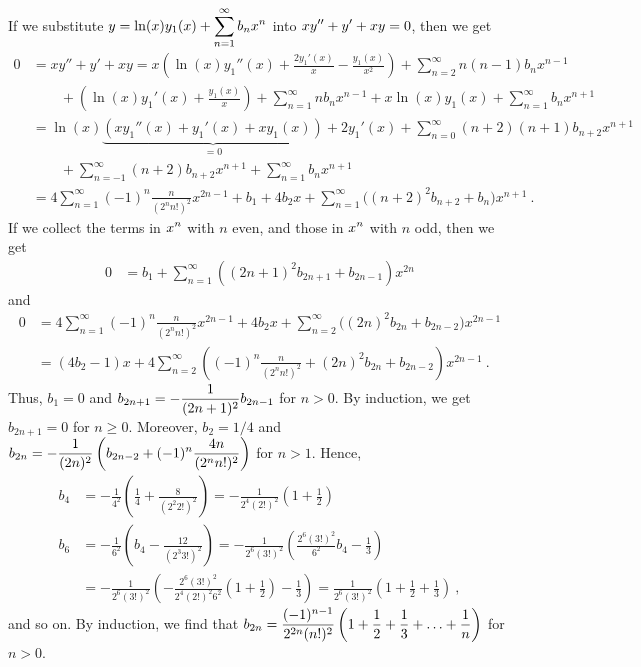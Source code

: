 \begin{egg}
If we substitute
$\displaystyle y = \ln(x)y_1(x) + \sum_{n=1}^\infty b_n x^n$ into
$\displaystyle xy''+ y' + xy = 0$, then we get
\begin{align*}
0 & = xy''+ y' + xy
= x\left( \ln(x) y_1''(x) + \frac{2y_1'(x)}{x}- \frac{y_1(x)}{x^2}\right)
+ \sum_{n=2}^\infty n(n-1) b_n x^{n-1}\\
&\qquad + \left( \ln(x) y_1'(x) + \frac{y_1(x)}{x}\right) 
+ \sum_{n=1}^\infty n b_n x^{n-1} + x \ln(x) y_1(x)
+ \sum_{n=1}^\infty b_n x^{n+1} \\
&= \ln(x) \underbrace{\left( x y_1''(x) + y_1'(x) + x y_1(x)\right)}_{=0}
+2 y_1'(x) + \sum_{n=0}^\infty (n+2)(n+1) b_{n+2} x^{n+1} \\
&\qquad + \sum_{n=-1}^\infty (n+2) b_{n+2} x^{n+1}
+ \sum_{n=1}^\infty b_n x^{n+1} \\
&=4\sum_{n=1}^\infty (-1)^n \frac{n}{ (2^n n!)^2}x^{2n-1} + b_1 + 4 b_2x
+ \sum_{n=1}^\infty \big( (n+2)^2 b_{n+2} + b_n\big) x^{n+1} \ .
\end{align*}
If we collect the terms in $\displaystyle x^n$ with $n$ even, and
those in $\displaystyle x^n$ with $n$ odd, then we get
\begin{align*}
0 &= b_1 + \sum_{n=1}^\infty \left((2n+1)^2 b_{2n+1}+b_{2n-1}\right) x^{2n}
\end{align*}
and
\begin{align*}
0 &= 4\sum_{n=1}^\infty (-1)^n \frac{n}{ (2^n n!)^2}x^{2n-1} + 4b_2 x 
+ \sum_{n=2}^\infty \big( (2n)^2 b_{2n} + b_{2n-2}\big) x^{2n-1} \\
&= (4b_2-1)x + 4\sum_{n=2}^\infty\left((-1)^n \frac{n}{(2^n n!)^2}
+ (2n)^2 b_{2n} + b_{2n-2}\right) x^{2n-1} \  .
\end{align*}
Thus, $b_1=0$ and
$\displaystyle b_{2n+1} = - \frac{1}{(2n+1)^2}b_{2n-1}$
for $n >0$.  By induction, we get $b_{2n+1} = 0$ for $n \geq 0$.
Moreover, $b_2 = 1/4$ and
$\displaystyle b_{2n} = -\frac{1}{(2n)^2} \left( b_{2n-2} +
 (-1)^n \frac{4n}{(2^n n!)^2}\right)$
for $n>1$.  Hence,
\begin{align*}
b_4 &= -\frac{1}{4^2} \left( \frac{1}{4} + \frac{8}{(2^2 2!)^2}\right)
= -\frac{1}{2^4 (2!)^2}\left( 1 + \frac{1}{2} \right) \\
b_6 &= -\frac{1}{6^2} \left( b_4 - \frac{12}{(2^3 3!)^2}\right)
= -\frac{1}{2^6 (3!)^2} \left( \frac{2^6(3!)^2}{6^2}b_4 -\frac{1}{3}\right) \\
&= -\frac{1}{2^6 (3!)^2} \left( 
-\frac{2^6(3!)^2}{2^4 (2!)^2 6^2}\left( 1 + \frac{1}{2} \right)
-\frac{1}{3}\right)
= \frac{1}{2^6 (3!)^2} \left( 1 + \frac{1}{2} + \frac{1}{3}\right) \ ,
\end{align*}
and so on.  By induction, we find that
$\displaystyle b_{2n} = \frac{(-1)^{n-1}}{2^{2n}(n!)^2}\left(1+\frac{1}{2}
  +\frac{1}{3} + \ldots + \frac{1}{n}\right)$
for $n > 0$.


\end{egg}
